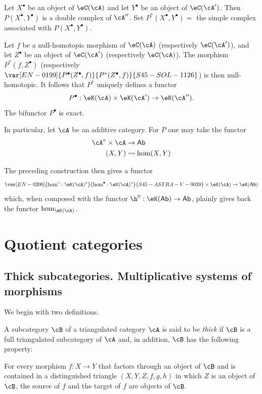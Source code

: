 Let $X^\bullet$ be an object of $\eC(\cA)$ and let $Y^\bullet$ be an
object of $\eC(\cA')$. Then $P(X^\bullet,Y^\bullet)$ is a double complex
of $\cA''$. Set $P^\ast(X^\bullet,Y^\bullet) = $ the simple complex
associated with $P(X^\bullet,Y^\bullet)$.

Let $f$ be a null-homotopic morphism of $\eC(\cA)$ (respectively
$\eC(\cA')$), and let $Z^\bullet$ be an object of $\eC(\cA')$
(respectively $\eC(\cA)$). The morphism $P^\ast(f,Z^\bullet)$
(respectively $\var[EN-0199]{P^\bullet(Z^\bullet,f)}{P^\ast(Z^\bullet,f)}{S45-SOL-1126}$) is then null-homotopic. It follows
that $P^\ast$ uniquely defines a functor
\[
  P^\bullet:\eK(\cA) \times \eK(\cA') \to \eK(\cA'') \text{.}
\]
The bifunctor $P^\bullet$ is exact.

In particular, let $\cA$ be an additive category. For $P$ one may take
the functor
\begin{align*}
  \cA^\circ\times \cA &\to \mathsf{Ab} \\
  (X,Y) &\leadsto \hom(X,Y)
\end{align*}

The preceding construction then gives a functor
\[
  \var[EN-0200]{\hom^\circ:\eK(\cA)^\circ}{\hom^\bullet:\eK(\cA)^\circ}{S45-ASTRA-V-0039} \times \eK(\cA) \to \eK(\mathsf{Ab})
\]
which, when composed with the functor
$\h^0:\eK(\mathsf{Ab})\to \mathsf{Ab}$, plainly gives back the functor
$\hom_{\eK(\cA)}$.

\section{Quotient categories}\label{VIII:2}

\subsection{Thick subcategories. Multiplicative systems of morphisms}\label{VIII:2-1}

We begin with two definitions.

\begin{definition}\label{VIII:2-1-1}
A subcategory $\cB$ of a triangulated category $\cA$ is said to be
\emph{thick} if $\cB$ is a full triangulated subcategory of $\cA$ and,
in addition, $\cB$ has the following property:

For every morphism $f:X\to Y$ that factors through an object of $\cB$ and
is contained in a distinguished triangle $(X,Y,Z,f,g,h)$ in which $Z$ is
an object of $\cB$, the source of $f$ and the target of $f$ are objects of
$\cB$.
\end{definition}

